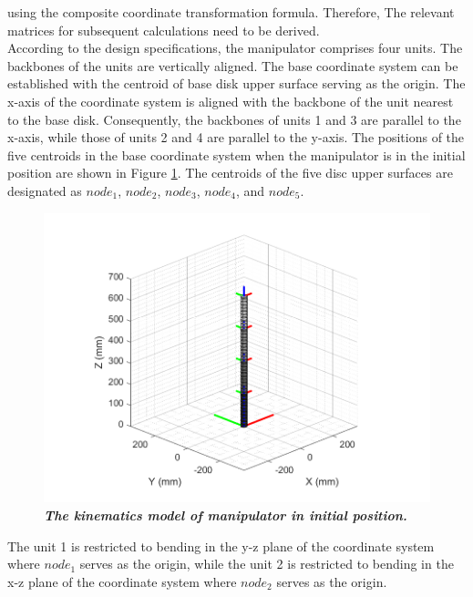 using the composite coordinate transformation formula. Therefore, The relevant matrices for subsequent calculations need to 
be derived. \\
According to the design specifications, the manipulator comprises four units. The backbones of the units are vertically aligned. 
The base coordinate system can be established with the centroid of base disk upper surface serving as the origin. The x-axis of 
the coordinate system is aligned with the backbone of the unit nearest to the base disk. Consequently, the backbones of units 1 
and 3 are parallel to the x-axis, while those of units 2 and 4 are parallel to the y-axis. The positions of the five centroids 
in the base coordinate system when the manipulator is in the initial position are shown in Figure \ref{fig:kinematics model 0_0_0_0}. 
The centroids of the five disc upper surfaces are designated as $node_1$, $node_2$, $node_3$, $node_4$, and $node_5$. \\
\begin{figure}[H] %
    \centering %
    \captionsetup{labelsep=colon}
    \includegraphics[width=1.0\textwidth]{Image/MATLAB/manipulator_0_0_0_0.png} 
    \caption[The kinematics model of manipulator in the initial position]
    {\centering \textit{\textbf{The kinematics model of manipulator in initial position.}}}
    \label{fig:kinematics model 0_0_0_0}
\end{figure}
\noindent The unit 1 is restricted to bending in the y-z plane of the coordinate system where $node_1$ serves as the origin, 
while the unit 2 is restricted to bending in the x-z plane of the coordinate system where $node_2$ serves as the origin. 
